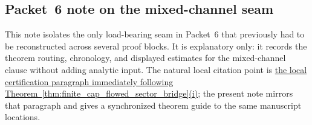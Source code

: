 \subsection{Packet~6 note on the mixed-channel seam}
\label{subsec:packet6_mixed_channel_note}

This note isolates the only load-bearing seam in Packet~6 that previously had to be reconstructed across several proof blocks.
It is explanatory only: it records the theorem routing, chronology, and displayed estimates for the mixed-channel clause without adding analytic input.
The natural local citation point is \hyperref[par:finite_cap_mixed_channel_certification]{the local certification paragraph immediately following Theorem~\ref{thm:finite_cap_flowed_sector_bridge}(i)}; the present note mirrors that paragraph and gives a synchronized theorem guide to the same manuscript locations.

